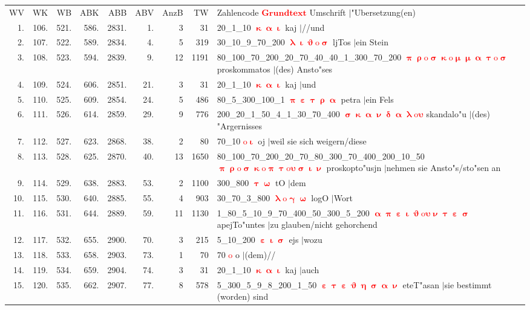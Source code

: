 \documentclass[a4paper,10pt,landscape]{article}
\begin{document}
\begin{tabular}{rrrrrrrrp{120mm}}
WV&WK&WB&ABK&ABB&ABV&AnzB&TW&Zahlencode \textcolor{red}{$\boldsymbol{Grundtext}$} Umschrift $|$"Ubersetzung(en)\\
1.&106.&521.&586.&2831.&1.&3&31&20\_1\_10 \textcolor{red}{$\boldsymbol{\upkappa\upalpha\upiota}$} kaj $|$//und\\
2.&107.&522.&589.&2834.&4.&5&319&30\_10\_9\_70\_200 \textcolor{red}{$\boldsymbol{\uplambda\upiota\upvartheta\mathrm{o}\upsigma}$} ljTos $|$ein Stein\\
3.&108.&523.&594.&2839.&9.&12&1191&80\_100\_70\_200\_20\_70\_40\_40\_1\_300\_70\_200 \textcolor{red}{$\boldsymbol{\uppi\uprho\mathrm{o}\upsigma\upkappa\mathrm{o}\upmu\upmu\upalpha\uptau\mathrm{o}\upsigma}$} proskommatos $|$(des) Ansto"ses\\
4.&109.&524.&606.&2851.&21.&3&31&20\_1\_10 \textcolor{red}{$\boldsymbol{\upkappa\upalpha\upiota}$} kaj $|$und\\
5.&110.&525.&609.&2854.&24.&5&486&80\_5\_300\_100\_1 \textcolor{red}{$\boldsymbol{\uppi\upepsilon\uptau\uprho\upalpha}$} petra $|$ein Fels\\
6.&111.&526.&614.&2859.&29.&9&776&200\_20\_1\_50\_4\_1\_30\_70\_400 \textcolor{red}{$\boldsymbol{\upsigma\upkappa\upalpha\upnu\updelta\upalpha\uplambda\mathrm{o}\upsilon}$} skandalo"u $|$(des) "Argernisses\\
7.&112.&527.&623.&2868.&38.&2&80&70\_10 \textcolor{red}{$\boldsymbol{\mathrm{o}\upiota}$} oj $|$weil sie sich weigern/diese\\
8.&113.&528.&625.&2870.&40.&13&1650&80\_100\_70\_200\_20\_70\_80\_300\_70\_400\_200\_10\_50 \textcolor{red}{$\boldsymbol{\uppi\uprho\mathrm{o}\upsigma\upkappa\mathrm{o}\uppi\uptau\mathrm{o}\upsilon\upsigma\upiota\upnu}$} proskopto"usjn $|$nehmen sie Ansto"s/sto"sen an\\
9.&114.&529.&638.&2883.&53.&2&1100&300\_800 \textcolor{red}{$\boldsymbol{\uptau\upomega}$} tO $|$dem\\
10.&115.&530.&640.&2885.&55.&4&903&30\_70\_3\_800 \textcolor{red}{$\boldsymbol{\uplambda\mathrm{o}\upgamma\upomega}$} logO $|$Wort\\
11.&116.&531.&644.&2889.&59.&11&1130&1\_80\_5\_10\_9\_70\_400\_50\_300\_5\_200 \textcolor{red}{$\boldsymbol{\upalpha\uppi\upepsilon\upiota\upvartheta\mathrm{o}\upsilon\upnu\uptau\upepsilon\upsigma}$} apejTo"untes $|$zu glauben/nicht gehorchend\\
12.&117.&532.&655.&2900.&70.&3&215&5\_10\_200 \textcolor{red}{$\boldsymbol{\upepsilon\upiota\upsigma}$} ejs $|$wozu\\
13.&118.&533.&658.&2903.&73.&1&70&70 \textcolor{red}{$\boldsymbol{\mathrm{o}}$} o $|$(dem)//\\
14.&119.&534.&659.&2904.&74.&3&31&20\_1\_10 \textcolor{red}{$\boldsymbol{\upkappa\upalpha\upiota}$} kaj $|$auch\\
15.&120.&535.&662.&2907.&77.&8&578&5\_300\_5\_9\_8\_200\_1\_50 \textcolor{red}{$\boldsymbol{\upepsilon\uptau\upepsilon\upvartheta\upeta\upsigma\upalpha\upnu}$} eteT"asan $|$sie bestimmt (worden) sind\\
\end{tabular}\medskip \\
\end{document}
